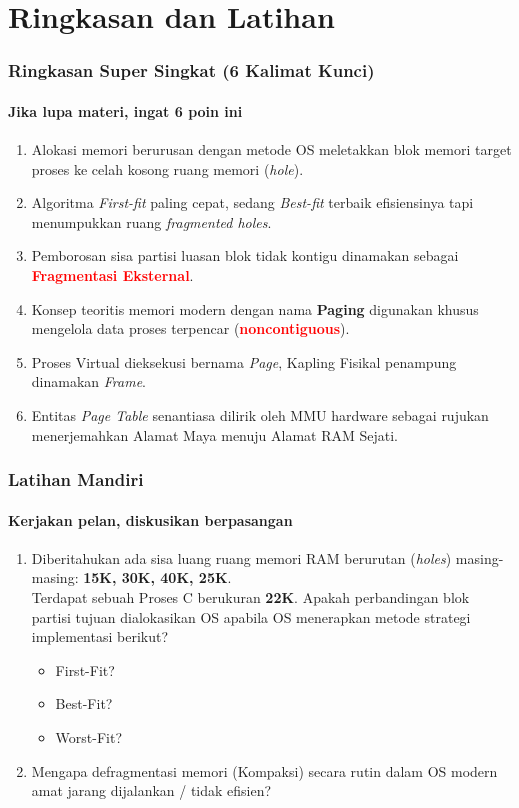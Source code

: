 \documentclass[t,aspectratio=169,xcolor=dvipsnames]{beamer}
\newcommand{\tem}[1]{\textbf{\textcolor{red}{#1}}}
\begin{document}
\section{Ringkasan dan Latihan}

\begin{frame}
    \frametitle{Ringkasan Super Singkat (6 Kalimat Kunci)}
    \framesubtitle{Jika lupa materi, ingat 6 poin ini}
    \small
    \begin{enumerate}
        \item Alokasi memori berurusan dengan metode OS meletakkan blok memori target proses ke celah kosong ruang memori (\textit{hole}).
        \item Algoritma \textit{First-fit} paling cepat, sedang \textit{Best-fit} terbaik efisiensinya tapi menumpukkan ruang \textit{fragmented holes}.
        \item Pemborosan sisa partisi luasan blok tidak kontigu dinamakan sebagai \tem{Fragmentasi Eksternal}.
        \item Konsep teoritis memori modern dengan nama \textbf{Paging} digunakan khusus mengelola data proses terpencar (\tem{noncontiguous}).
        \item Proses Virtual dieksekusi bernama \textit{Page}, Kapling Fisikal penampung dinamakan \textit{Frame}.
        \item Entitas \textit{Page Table} senantiasa dilirik oleh MMU hardware sebagai rujukan menerjemahkan Alamat Maya menuju Alamat RAM Sejati.
    \end{enumerate}
\end{frame}

\begin{frame}
    \frametitle{Latihan Mandiri}
    \framesubtitle{Kerjakan pelan, diskusikan berpasangan}
    \small
    \begin{enumerate}
        \item Diberitahukan ada sisa luang ruang memori RAM berurutan (\textit{holes}) masing-masing: \textbf{15K, 30K, 40K, 25K}. \\
        Terdapat sebuah Proses C berukuran \textbf{22K}. Apakah perbandingan blok partisi tujuan dialokasikan OS apabila OS menerapkan metode strategi implementasi berikut?
        \begin{itemize}
            \item First-Fit?
            \item Best-Fit?
            \item Worst-Fit?
        \end{itemize}
        \item Mengapa defragmentasi memori (Kompaksi) secara rutin dalam OS modern amat jarang dijalankan / tidak efisien?
    \end{enumerate}
\end{frame}
\end{document}

